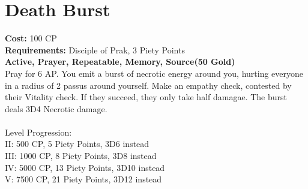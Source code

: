 \section{Death Burst}
\textbf{Cost:} 100 CP\\
\textbf{Requirements:} Disciple of Prak, 3 Piety Points \\
\textbf{Active, Prayer, Repeatable, Memory, Source(50 Gold)}\\
Pray for 6 AP. You emit a burst of necrotic energy around you, hurting everyone in a radius of 2 passus around yourself. Make an empathy check, contested by their Vitality check. If they succeed, they only take half damagae. The burst deals 3D4 Necrotic damage.\\
\\
Level Progression:\\
II: 500 CP, 5 Piety Points, 3D6 instead\\
III: 1000 CP, 8 Piety Points, 3D8 instead\\
IV: 5000 CP, 13 Piety Points, 3D10 instead\\
V: 7500 CP, 21 Piety Points, 3D12 instead\\